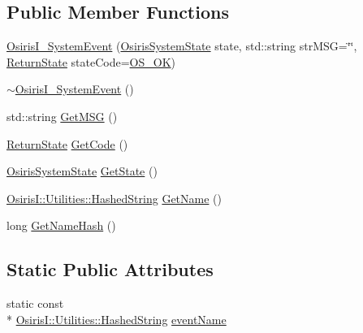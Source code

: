 \subsection*{Public Member Functions}
\begin{DoxyCompactItemize}
\item 
\hyperlink{struct_osiris_i_1_1_events_1_1_osiris_i___system_event_a49caa4c7ded3e0471c059cbc996299a1}{Osiris\-I\-\_\-\-System\-Event} (\hyperlink{namespace_osiris_i_1_1_events_a045d02c48bfbfffe08648c8d38a983b4}{Osiris\-System\-State} state, std\-::string str\-M\-S\-G=\char`\"{}\char`\"{}, \hyperlink{namespace_osiris_i_a8f53bf938dc75c65c6a529694514013e}{Return\-State} state\-Code=\hyperlink{_osiris_i_extern_structs_8hpp_ae5506797548c89cf151caf7b00ecdee0}{O\-S\-\_\-\-O\-K})
\item 
\hyperlink{struct_osiris_i_1_1_events_1_1_osiris_i___system_event_aa006c95d8fb097d9750438ede9377758}{$\sim$\-Osiris\-I\-\_\-\-System\-Event} ()
\item 
std\-::string \hyperlink{struct_osiris_i_1_1_events_1_1_osiris_i___system_event_a5e6d289e93c0da7fb79634a8594560da}{Get\-M\-S\-G} ()
\item 
\hyperlink{namespace_osiris_i_a8f53bf938dc75c65c6a529694514013e}{Return\-State} \hyperlink{struct_osiris_i_1_1_events_1_1_osiris_i___system_event_a5a4597576ff839eb01bc969630bf9885}{Get\-Code} ()
\item 
\hyperlink{namespace_osiris_i_1_1_events_a045d02c48bfbfffe08648c8d38a983b4}{Osiris\-System\-State} \hyperlink{struct_osiris_i_1_1_events_1_1_osiris_i___system_event_a866afe209a4ac4c4ea94745c63fb9ed4}{Get\-State} ()
\item 
\hyperlink{class_osiris_i_1_1_utilities_1_1_hashed_string}{Osiris\-I\-::\-Utilities\-::\-Hashed\-String} \hyperlink{struct_osiris_i_1_1_events_1_1_osiris_i___system_event_a176ed6087893de9a6de67f1aeea4d917}{Get\-Name} ()
\item 
long \hyperlink{struct_osiris_i_1_1_events_1_1_osiris_i___system_event_a28e210babfa98ce46188916277812322}{Get\-Name\-Hash} ()
\end{DoxyCompactItemize}
\subsection*{Static Public Attributes}
\begin{DoxyCompactItemize}
\item 
static const \\*
\hyperlink{class_osiris_i_1_1_utilities_1_1_hashed_string}{Osiris\-I\-::\-Utilities\-::\-Hashed\-String} \hyperlink{struct_osiris_i_1_1_events_1_1_osiris_i___system_event_a87db6f53631a86fa8101b3d2c22f8ca4}{event\-Name}
\end{DoxyCompactItemize}
